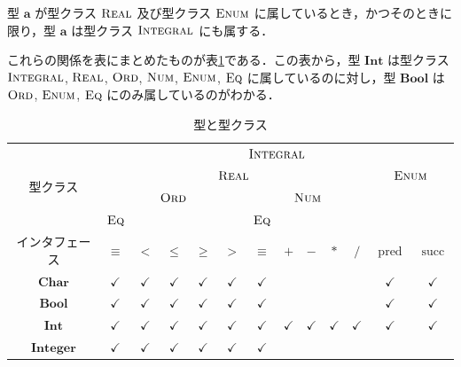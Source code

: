 \documentclass[a4paper,twocolumn]{jsbook}
\DeclareMathOperator{\mPred}{pred}
\DeclareMathOperator{\mSucc}{succ}
\newcommand{\mType}[1]{\mathbf{#1}}
\newcommand{\mBoolType}{\mType{Bool}}
\newcommand{\mCharType}{\mType{Char}}
\newcommand{\mIntType}{\mType{Int}}
\newcommand{\mIntegerType}{\mType{Integer}}
\newcommand{\mSpecialTypeClass}[1]{\textsc{#1}} %
\newcommand{\mEnumTypeClass}{\mSpecialTypeClass{Enum}}
\newcommand{\mEqTypeClass}{\mSpecialTypeClass{Eq}}
\newcommand{\mIntegralTypeClass}{\mSpecialTypeClass{Integral}}
\newcommand{\mNumTypeClass}{\mSpecialTypeClass{Num}}
\newcommand{\mOrdTypeClass}{\mSpecialTypeClass{Ord}}
\newcommand{\mRealTypeClass}{\mSpecialTypeClass{Real}}
\begin{document}
型 $\mType{a}$ が型クラス $\mRealTypeClass$ 及び型クラス $\mEnumTypeClass$ に属しているとき，かつそのときに限り，型 $\mType{a}$ は型クラス $\mIntegralTypeClass$ にも属する．

これらの関係を表にまとめたものが表\ref{tab:type-and-typeclass}である．この表から，型 $\mIntType$ は型クラス $\mIntegralTypeClass$, $\mRealTypeClass$, $\mOrdTypeClass$, $\mNumTypeClass$, $\mEnumTypeClass$, $\mEqTypeClass$ に属しているのに対し，型 $\mBoolType$ は $\mOrdTypeClass$, $\mEnumTypeClass$, $\mEqTypeClass$ にのみ属しているのがわかる．

\begin{table}
\caption{型と型クラス}
\label{tab:type-and-typeclass}
\begin{center}
\begin{tabular}{||c||c|c|c|c|c|c|c|c|c|c|c|c||}
\hline
\multirow{4}{*}{型クラス}
    &\multicolumn{12}{|c||}{$\mIntegralTypeClass$}\\
\cline{2-13}
\multirow{3}{*}{}
    &\multicolumn{10}{|c|}{$\mRealTypeClass$}
    &\multicolumn{2}{|c||}{$\mEnumTypeClass$}\\
\cline{2-11}
\multirow{2}{*}{}
    &\multicolumn{5}{|c|}{$\mOrdTypeClass$}
    &\multicolumn{5}{|c|}{$\mNumTypeClass$}
    &\multicolumn{2}{|c||}{ }\\
\cline{2-2}\cline{7-7}
{ }
    &$\mEqTypeClass$
    &\multicolumn{4}{|c|}{ }
    &$\mEqTypeClass$
    &\multicolumn{4}{|c|}{ }
    &\multicolumn{2}{|c||}{ }\\
\hline
インタフェース
    &$\equiv$
    &$<$
    &$\le$
    &$\ge$
    &$>$
    &$\equiv$
    &$+$
    &$-$
    &$*$
    &$/$
    &$\mPred$
    &$\mSucc$\\
\hline\hline
$\mCharType$
    &$\checkmark$
    &$\checkmark$
    &$\checkmark$
    &$\checkmark$
    &$\checkmark$
    &$\checkmark$
    &
    &
    &
    &
    &$\checkmark$
    &$\checkmark$\\
\hline
$\mBoolType$
    &$\checkmark$
    &$\checkmark$
    &$\checkmark$
    &$\checkmark$
    &$\checkmark$
    &$\checkmark$
    &
    &
    &
    &
    &$\checkmark$
    &$\checkmark$\\
\hline
$\mIntType$
    &$\checkmark$
    &$\checkmark$
    &$\checkmark$
    &$\checkmark$
    &$\checkmark$
    &$\checkmark$
    &$\checkmark$
    &$\checkmark$
    &$\checkmark$
    &$\checkmark$
    &$\checkmark$
    &$\checkmark$\\
\hline
$\mIntegerType$
    &$\checkmark$
    &$\checkmark$
    &$\checkmark$
    &$\checkmark$
    &$\checkmark$
    &$\checkmark$

\end{tabular}
\end{center}
\end{table}
\end{document}
